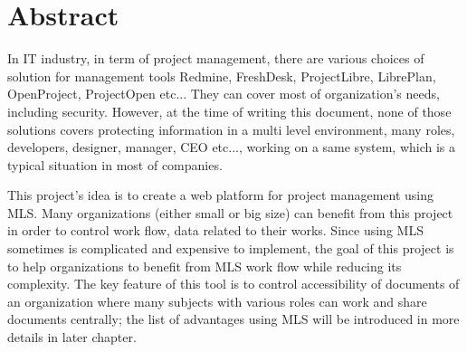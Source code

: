 

\begingroup
\let\clearpage\relax
\let\cleardoublepage\relax
\let\cleardoublepage\relax

\chapter*{Abstract} %

In IT industry, in term of project management, there are various choices of solution for management tools \eg Redmine, FreshDesk, ProjectLibre, LibrePlan, OpenProject, ProjectOpen etc... They can cover most of organization's needs, including security. However, at the time of writing this document, none of those solutions covers protecting information in a multi level environment, \ie many roles, \eg developers, designer, manager, CEO etc..., working on a same system, which is a typical situation in most of companies. 

This project's idea is to create a web platform for project management using MLS. Many organizations (either small or big size) can benefit from this project in order to control work flow, data related to their works. Since using MLS sometimes is complicated and expensive to implement, the goal of this project is to help organizations to benefit from MLS work flow while reducing its complexity. The key feature of this tool is to control accessibility of documents of an organization where many subjects with various roles can work and share documents centrally; the list of advantages using MLS will be introduced in more details in later chapter.

 \endgroup			

\vfill
